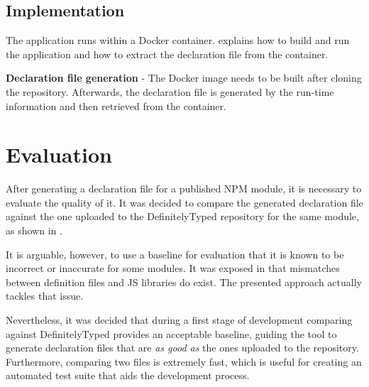 \subsection{Implementation}
The application runs within a Docker container.  explains how to build and run the application and how to extract the declaration file from the container.

\begin{code}
  \caption[Declaration file generation]{\textbf{Declaration file generation} - The Docker image needs to be built after cloning the repository. Afterwards, the declaration file is generated by the run-time information and then retrieved from the container.}
  \label{code:declaration-file-generation-docker}
\end{code}

\section{Evaluation}
After generating a declaration file for a published NPM module, it is necessary to evaluate the quality of it. It was decided to compare the generated declaration file against the one uploaded to the DefinitelyTyped repository for the same module, as shown in .

It is arguable, however, to use a baseline for evaluation that it is known to be incorrect or inaccurate for some modules. It was exposed in  that mismatches between definition files and JS libraries do exist. The presented approach actually tackles that issue. 

Nevertheless, it was decided that during a first stage of development comparing against DefinitelyTyped provides an acceptable baseline, guiding the tool to generate declaration files that are \textit{as good as} the ones uploaded to the repository. Furthermore, comparing two files is extremely fast, which is useful for creating an automated test suite that aids the development process.

